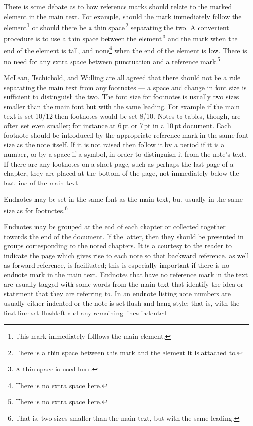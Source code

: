 \documentclass[10pt,letterpaper,extrafontsizes]{memoir}
\newcommand\U[2]{\textrm{#1}\,\textrm{#2}}
\begin{document}
    There is some debate as to how reference marks should relate to the 
marked element in the main text. For example, should the mark immediately 
follow the element\footnote{This mark immediately folllows the main element.} 
or should there be a thin space\,\footnote{There is a thin space between this
mark and the element it is attached to.} separating the two. A convenient 
procedure is to use a thin space between the 
element\,\footnote{A thin space is used here.} and the mark when the end of 
the element is tall, and 
none\footnote{There is no extra space here.} when the end of the element is 
low. There is no need for any extra space between punctuation and a reference
mark.\footnote{There is no extra space here.}

    McLean, Tschichold, and Wulling are all agreed that there should not be
a rule separating the main text from any footnotes --- a space and change in
font size is sufficient to distinguish the two. The font size for 
footnotes
is usually two sizes smaller than the main font but with the same 
leading. For example if the main text is set 10/12 then 
footnotes would be set 8/10. Notes to tables, though, are often set even 
smaller; for instance at \U{6}{pt} or \U{7}{pt} in a \U{10}{pt} document. 
Each footnote should be introduced by the 
appropriate reference mark in the same font size as the note itself. If it is 
not raised then follow it by a period if it is a number, or by a space 
if a symbol, in order to distinguish it from the note's text. 
If there are any footnotes on a
short page, such as perhaps the last page of a chapter, they are placed
at the bottom of the page, not immediately below the last line of the main 
text.

   Endnotes may be set in the same font as the main text, but usually in
the same size as for footnotes.\footnote{That is, two
sizes smaller than the main text, but with the same leading.} 

   Endnotes may be grouped at the end of each chapter or collected together
towards the end of the document. If the latter, then they should be presented
in groups corresponding to the noted chapters. It is a courtesy to the reader
to indicate the page which gives rise to each note so that backward reference,
as well as forward reference, is facilitated; this is especially important
if there is no endnote mark in the main text. Endnotes
that have no reference mark in the text are usually
tagged with some words from the main text that identify the idea or statement
that they are referring to.
   In an endnote listing note numbers are usually either indented or the note
is set flush-and-hang style; that is, with the 
first line set flushleft and any remaining lines indented.
\end{document}
